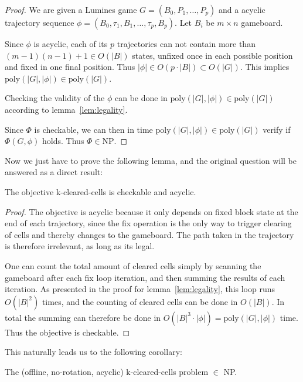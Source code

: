 \begin{proof}
We are given a Lumines game $G = (B_0, P_1, \ldots, P_p)$ and a acyclic trajectory sequence $\phi = (B_0, \tau_1, B_1, \ldots ,\tau_p, B_p)$. Let $B_i$ be $m \times n$ gameboard.

Since $\phi$ is acyclic, each of its $p$ trajectories can not contain more than $(m-1)(n-1) + 1 \in O(|B|)$ states, unfixed once in each possible position and fixed in one final position. Thus $|\phi| \in O(p \cdot |B|) \subset O(|G|)$. This implies $\text{poly}(|G|, |\phi|) \in \text{poly}(|G|)$.

Checking the validity of the $\phi$ can be done in $\text{poly}(|G|, |\phi|) \in \text{poly}(|G|)$ according to lemma~\ref{lem:legality}.

Since $\Phi$ is checkable, we can then in time $\text{poly}(|G|, |\phi|) \in \text{poly}(|G|)$ verify if $\Phi(G, \phi)$ holds. Thus $\Phi \in \text{NP}$.
\end{proof}

Now we just have to prove the following lemma, and the original question will be answered as a direct result:\\

\begin{lem}
The objective k-cleared-cells is checkable and acyclic.
\end{lem}

\begin{proof}
The objective is acyclic because it only depends on fixed block state at the end of each trajectory, since the fix operation is the only way to trigger clearing of cells and thereby changes to the gameboard. The path taken in the trajectory is therefore irrelevant, as long as its legal. 

One can count the total amount of cleared cells simply by scanning the gameboard after each fix loop iteration, and then summing the results of each iteration. As presented in the proof for lemma~\ref{lem:legality}, this loop runs $O(|B|^2)$ times, and the counting of cleared cells can be done in $O(|B|)$. In total the summing can therefore be done in $O(|B|^3 \cdot |\phi|) = \text{poly}(|G|, |\phi|)$ time. Thus the objective is checkable.
\end{proof}

This naturally leads us to the following corollary:\\

\begin{cor}
\label{cor:np}
The (offline, no-rotation, acyclic) k-cleared-cells problem $\in$ NP.
\end{cor}
